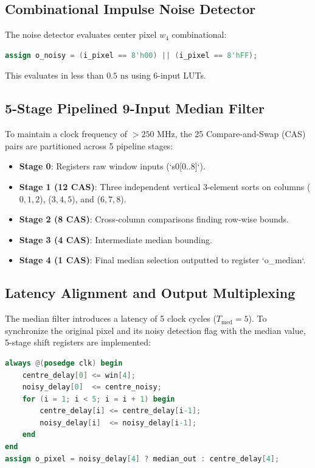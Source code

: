 \documentclass[12pt,a4paper]{article}
\begin{document}
\subsection{Combinational Impulse Noise Detector}
The noise detector evaluates center pixel $w_4$ combinational:
\begin{lstlisting}[language=Verilog]
assign o_noisy = (i_pixel == 8'h00) || (i_pixel == 8'hFF);
\end{lstlisting}
This evaluates in less than $0.5\text{ ns}$ using 6-input LUTs.

\subsection{5-Stage Pipelined 9-Input Median Filter}
To maintain a clock frequency of $>250\text{ MHz}$, the 25 Compare-and-Swap (CAS) pairs are partitioned across 5 pipeline stages:
\begin{itemize}
    \item \textbf{Stage 0}: Registers raw window inputs (`s0[0..8]`).
    \item \textbf{Stage 1 (12 CAS)}: Three independent vertical 3-element sorts on columns ($0,1,2$), ($3,4,5$), and ($6,7,8$).
    \item \textbf{Stage 2 (8 CAS)}: Cross-column comparisons finding row-wise bounds.
    \item \textbf{Stage 3 (4 CAS)}: Intermediate median bounding.
    \item \textbf{Stage 4 (1 CAS)}: Final median selection outputted to register `o_median`.
\end{itemize}

\subsection{Latency Alignment and Output Multiplexing}
The median filter introduces a latency of 5 clock cycles ($T_{\text{med}} = 5$). To synchronize the original pixel and its noisy detection flag with the median value, 5-stage shift registers are implemented:
\begin{lstlisting}[language=Verilog]
always @(posedge clk) begin
    centre_delay[0] <= win[4];
    noisy_delay[0]  <= centre_noisy;
    for (i = 1; i < 5; i = i + 1) begin
        centre_delay[i] <= centre_delay[i-1];
        noisy_delay[i]  <= noisy_delay[i-1];
    end
end
assign o_pixel = noisy_delay[4] ? median_out : centre_delay[4];
\end{lstlisting}
\end{document}
